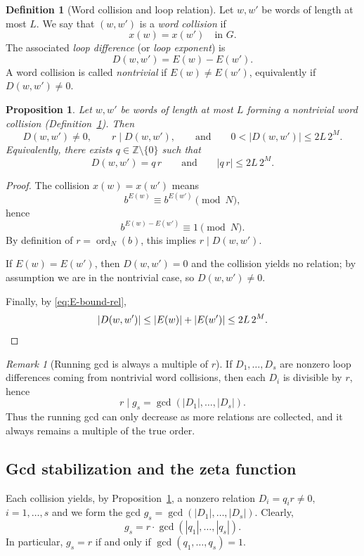 \documentclass[11pt,reqno]{article}
\numberwithin{equation}{section}
\DeclareMathOperator{\ord}{ord}
\theoremstyle{plain}
\newtheorem{proposition}[theorem]{Proposition}
\theoremstyle{definition}
\newtheorem{definition}[theorem]{Definition}
\theoremstyle{remark}
\newtheorem{remark}[theorem]{Remark}
\newcommand{\Z}{\mathbb{Z}}
\begin{document}
\begin{definition}[Word collision and loop relation]\label{def:word-collision-loop}
Let $w,w'$ be words of length at most $L$.
We say that $(w,w')$ is a \emph{word collision} if
\[
x(w)=x(w') \quad \text{in } G.
\]
The associated \emph{loop difference} (or \emph{loop exponent}) is
\[
D(w,w')=E(w)-E(w').
\]
A word collision is called \emph{nontrivial} if $E(w)\neq E(w')$, equivalently if $D(w,w')\neq 0$.
\end{definition}

\begin{proposition}\label{prop:loop-multiple-clean}
Let $w,w'$ be words of length at most $L$ forming a \emph{nontrivial} word collision
(Definition~\ref{def:word-collision-loop}). Then
\[
D(w,w') \neq 0,\qquad r\mid D(w,w'),
\qquad \text{and}\qquad 0<|D(w,w')|\le 2L\,2^M.
\]
Equivalently, there exists $q\in\Z\setminus\{0\}$ such that
\[
D(w,w')=q\,r
\qquad\text{and}\qquad
|q\,r|\le 2L\,2^M.
\]
\end{proposition}

\begin{proof}
The collision $x(w)=x(w')$ means
\[
b^{E(w)}\equiv b^{E(w')}\pmod N,
\]
hence
\[
b^{E(w)-E(w')}\equiv 1\pmod N.
\]
By definition of $r=\ord_N(b)$, this implies $r\mid D(w,w')$.

If $E(w)=E(w')$, then $D(w,w')=0$ and the collision yields no relation; by assumption we are in
the nontrivial case, so $D(w,w')\neq 0$.

Finally, by \eqref{eq:E-bound-rel},
\[
|D(w,w')|\le |E(w)|+|E(w')|\le 2L\,2^M.\qedhere
\]
\end{proof}

\begin{remark}[Running gcd is always a multiple of $r$]\label{rem:gcd-multiple}
If $D_1,\dots,D_s$ are nonzero loop differences coming from nontrivial word collisions, then each
$D_i$ is divisible by $r$, hence
\[
r \mid g_s=\gcd(|D_1|,\dots,|D_s|).
\]
Thus the running gcd can only decrease as more relations are collected, and it always remains a
multiple of the true order.
\end{remark}



\subsection{Gcd stabilization and the zeta function}
\label{subsec:gcd-zeta-clean}

Each collision yields, by Proposition~\ref{prop:loop-multiple-clean}, a nonzero relation $D_i = q_i r \neq 0,$ $i=1,\ldots, s$ and we form the gcd $g_s=\gcd(|D_1|,\dots,|D_s|).$
Clearly,
\[
g_s=r\cdot \gcd(|q_1|,\dots,|q_s|).
\]
In particular, $g_s=r$ if and only if $\gcd(q_1,\dots,q_s)=1$.
\end{document}
